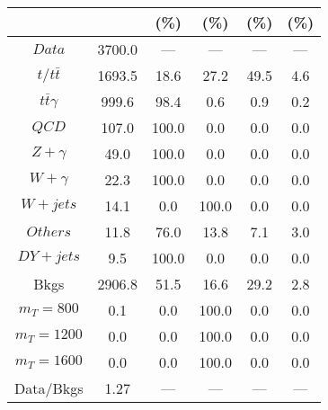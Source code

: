 \begin{figure}
\begin{minipage}[c]{0.32\textwidth}
{\begin{tabular}{cccccc}
 &  & (\%) & (\%) & (\%) & (\%)  \\
\hline
                                                                      $ Data $ &  3700.0 &  --- &  --- &  --- &  ---\\
$ t/t\bar{t} $ &  1693.5 &  18.6 &  27.2 &  49.5 &  4.6\\
$ t\bar{t}\gamma $ &  999.6 &  98.4 &  0.6 &  0.9 &  0.2\\
$ QCD $ &  107.0 &  100.0 &  0.0 &  0.0 &  0.0\\
$ Z+\gamma $ &  49.0 &  100.0 &  0.0 &  0.0 &  0.0\\
$ W+\gamma $ &  22.3 &  100.0 &  0.0 &  0.0 &  0.0\\
$ W+jets $ &  14.1 &  0.0 &  100.0 &  0.0 &  0.0\\
$ Others $ &  11.8 &  76.0 &  13.8 &  7.1 &  3.0\\
$ DY+jets $ &  9.5 &  100.0 &  0.0 &  0.0 &  0.0\\
Bkgs &  2906.8 &  51.5 &  16.6 &  29.2 &  2.8\\
$ m_{T} = 800 $ &  0.1 &  0.0 &  100.0 &  0.0 &  0.0\\
$ m_{T} = 1200 $ &  0.0 &  0.0 &  100.0 &  0.0 &  0.0\\
$ m_{T} = 1600 $ &  0.0 &  0.0 &  100.0 &  0.0 &  0.0\\
Data/Bkgs &  1.27 &  --- &  --- &  --- &  ---\\
\hline
\end{tabular}
}
\end{minipage}
\end{figure}

